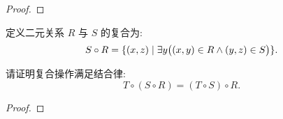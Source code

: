 \documentclass[a4paper, justified]{tufte-handout}
\begin{document}
\begin{proof}
\end{proof}

\begin{problem}[UD Problem 12.11 (a, b)]
\end{problem}

\begin{solution}
\end{solution}

\begin{problem}[UD Problem 12.12]
\end{problem}

\begin{solution}
\end{solution}

\begin{problem}[UD Problem 13.14]
\end{problem}

\begin{solution}
\end{solution}

\beginoptional

\begin{problem}[关系的复合]
  定义二元关系 $R$ 与 $S$ 的复合为:
  \[
    S \circ R = \{(x, z) \mid \exists y \big((x, y) \in R \land (y, z) \in S \big)\}.
  \]

  \noindent 请证明复合操作满足结合律:
  \[
    T \circ (S \circ R) = (T \circ S) \circ R.
  \]
\end{problem}

\begin{proof}
\end{proof}

\beginot
\end{document}

